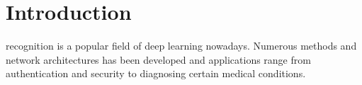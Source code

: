 \documentclass[10pt,journal,compsoc]{IEEEtran}
\begin{document}
%
\IEEEpeerreviewmaketitle


\ifCLASSOPTIONcompsoc
{}
\else
\section{Introduction}
\label{sec:introduction}
\fi




% 
% 
% 
% 
 recognition is a popular field  of deep learning nowadays. Numerous methods and network architectures has been developed and applications range from authentication and security to diagnosing certain medical conditions.
\end{document}
